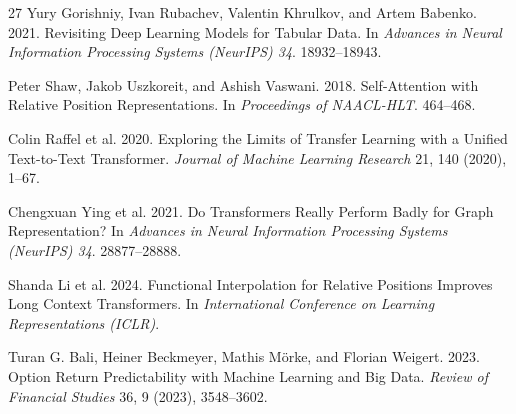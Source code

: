 \documentclass[sigconf,review]{acmart}
\begin{document}
\begin{thebibliography}{27}
Yury Gorishniy, Ivan Rubachev, Valentin Khrulkov, and Artem Babenko. 2021. Revisiting Deep Learning Models for Tabular Data. In \textit{Advances in Neural Information Processing Systems (NeurIPS) 34}. 18932--18943.

Peter Shaw, Jakob Uszkoreit, and Ashish Vaswani. 2018. Self-Attention with Relative Position Representations. In \textit{Proceedings of NAACL-HLT}. 464--468.

Colin Raffel et al. 2020. Exploring the Limits of Transfer Learning with a Unified Text-to-Text Transformer. \textit{Journal of Machine Learning Research} 21, 140 (2020), 1--67.

Chengxuan Ying et al. 2021. Do Transformers Really Perform Badly for Graph Representation? In \textit{Advances in Neural Information Processing Systems (NeurIPS) 34}. 28877--28888.

Shanda Li et al. 2024. Functional Interpolation for Relative Positions Improves Long Context Transformers. In \textit{International Conference on Learning Representations (ICLR)}.

Turan G. Bali, Heiner Beckmeyer, Mathis M\"orke, and Florian Weigert. 2023. Option Return Predictability with Machine Learning and Big Data. \textit{Review of Financial Studies} 36, 9 (2023), 3548--3602.

\end{thebibliography}
\endgroup
\end{document}
